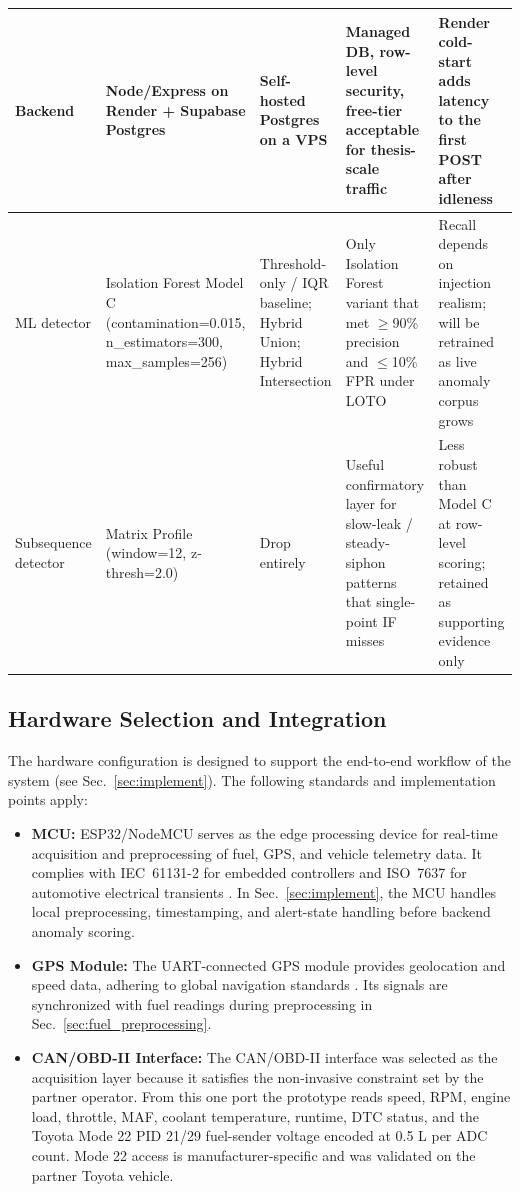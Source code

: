 {\begin{longtable}{|p{}|p{}|p{}|p{}|p{}|}
\hline
Backend & Node/Express on Render + Supabase Postgres & Self-hosted Postgres on a VPS & Managed DB\glsadd{DB}, row-level security, free-tier acceptable for thesis-scale traffic & Render cold-start adds latency to the first POST after idleness \\
\hline
ML detector & Isolation Forest Model C (contamination=0.015, n\_estimators=300, max\_samples=256) & Threshold-only / IQR baseline; Hybrid Union; Hybrid Intersection & Only Isolation Forest variant that met $\geq$90\% precision and $\leq$10\% FPR under LOTO & Recall depends on injection realism; will be retrained as live anomaly corpus grows \\
\hline
Subsequence detector & Matrix Profile (window=12, z-thresh=2.0) & Drop entirely & Useful confirmatory layer for slow-leak / steady-siphon patterns that single-point IF misses & Less robust than Model C at row-level scoring; retained as supporting evidence only \\
\hline
\end{longtable}
}
\normalsize
\FloatBarrier

\subsection{Hardware Selection and Integration}  

The hardware configuration is designed to support the end-to-end workflow of the system (see Sec.~\ref{sec:implement}). The following standards and implementation points apply:

\begin{itemize}  
    \item \textbf{MCU:} ESP32/NodeMCU serves as the edge processing device for real-time acquisition and preprocessing of fuel, GPS, and vehicle telemetry data. It complies with IEC~61131-2 for embedded controllers \cite{iec61131} and ISO~7637 for automotive electrical transients \cite{iso7637}. In Sec.~\ref{sec:implement}, the MCU handles local preprocessing, timestamping, and alert-state handling before backend anomaly scoring.

    \item \textbf{GPS Module:} The UART-connected GPS module provides geolocation and speed data, adhering to global navigation standards \cite{gpsstd}. Its signals are synchronized with fuel readings during preprocessing in Sec.~\ref{sec:fuel_preprocessing}.

    \item \textbf{CAN/OBD-II Interface:} The CAN/OBD-II interface was selected as the acquisition layer because it satisfies the non-invasive constraint set by the partner operator. From this one port the prototype reads speed, RPM, engine load, throttle, MAF, coolant temperature, runtime, DTC status, and the Toyota Mode 22 PID 21/29 fuel-sender voltage encoded at 0.5 L per ADC count. Mode 22 access is manufacturer-specific and was validated on the partner Toyota vehicle.
\end{itemize}  

